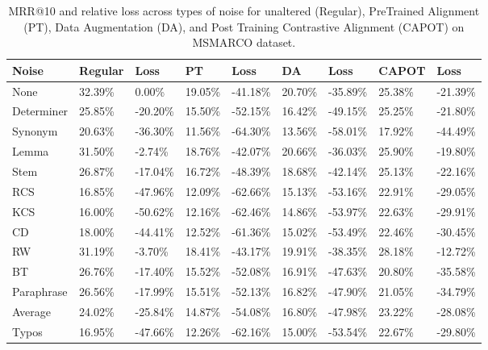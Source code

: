 \begin{table*}[!ht]
    \centering
   
    \begin{tabular}{|l|l|l|l|l|l|l|l|l|}
    \hline
        Noise & Regular & Loss & PT & Loss & DA & Loss & CAPOT & Loss \\ \hline
        None & 32.39\% & 0.00\% & 19.05\% & -41.18\% & 20.70\% & -35.89\% & 25.38\% & -21.39\% \\ \hline
        Determiner & 25.85\% & -20.20\% & 15.50\% & -52.15\% & 16.42\% & -49.15\% & 25.25\% & -21.80\% \\ \hline
        Synonym & 20.63\% & -36.30\% & 11.56\% & -64.30\% & 13.56\% & -58.01\% & 17.92\% & -44.49\% \\ \hline
        Lemma & 31.50\% & -2.74\% & 18.76\% & -42.07\% & 20.66\% & -36.03\% & 25.90\% & -19.80\% \\ \hline
        Stem & 26.87\% & -17.04\% & 16.72\% & -48.39\% & 18.68\% & -42.14\% & 25.13\% & -22.16\% \\ \hline
        RCS & 16.85\% & -47.96\% & 12.09\% & -62.66\% & 15.13\% & -53.16\% & 22.91\% & -29.05\% \\ \hline
        KCS & 16.00\% & -50.62\% & 12.16\% & -62.46\% & 14.86\% & -53.97\% & 22.63\% & -29.91\% \\ \hline
        CD & 18.00\% & -44.41\% & 12.52\% & -61.36\% & 15.02\% & -53.49\% & 22.46\% & -30.45\% \\ \hline
        RW & 31.19\% & -3.70\% & 18.41\% & -43.17\% & 19.91\% & -38.35\% & 28.18\% & -12.72\% \\ \hline
        BT & 26.76\% & -17.40\% & 15.52\% & -52.08\% & 16.91\% & -47.63\% & 20.80\% & -35.58\% \\ \hline
        Paraphrase & 26.56\% & -17.99\% & 15.51\% & -52.13\% & 16.82\% & -47.90\% & 21.05\% & -34.79\% \\ \hline
        Average & 24.02\% & -25.84\% & 14.87\% & -54.08\% & 16.80\% & -47.98\% & 23.22\% & -28.08\% \\ \hline
        Typos & 16.95\% & -47.66\% & 12.26\% & -62.16\% & 15.00\% & -53.54\% & 22.67\% & -29.80\% \\ \hline
    \end{tabular}
    \caption{MRR@10 and relative loss across types of noise for unaltered (Regular), PreTrained Alignment (PT),  Data Augmentation (DA), and Post Training Contrastive Alignment (CAPOT) on MSMARCO dataset.}
    \label{tab:capot-msmarco-mrr10}
\end{table*}
